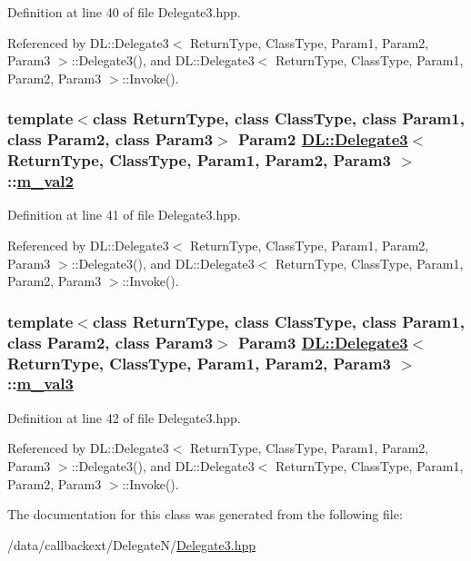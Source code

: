 Definition at line 40 of file Delegate3.hpp.

Referenced by DL::Delegate3$<$ Return\-Type, Class\-Type, Param1, Param2, Param3 $>$::Delegate3(), and DL::Delegate3$<$ Return\-Type, Class\-Type, Param1, Param2, Param3 $>$::Invoke().\hypertarget{classDL_1_1Delegate3_r3}{
\subsubsection[m\_\-val2]{\setlength{\rightskip}{0pt plus 5cm}template$<$class Return\-Type, class Class\-Type, class Param1, class Param2, class Param3$>$ Param2 \hyperlink{classDL_1_1Delegate3}{DL::Delegate3}$<$ Return\-Type, Class\-Type, Param1, Param2, Param3 $>$::\hyperlink{classDL_1_1Delegate3_r3}{m\_\-val2}}}
\label{classDL_1_1Delegate3_r3}




Definition at line 41 of file Delegate3.hpp.

Referenced by DL::Delegate3$<$ Return\-Type, Class\-Type, Param1, Param2, Param3 $>$::Delegate3(), and DL::Delegate3$<$ Return\-Type, Class\-Type, Param1, Param2, Param3 $>$::Invoke().\hypertarget{classDL_1_1Delegate3_r4}{
\subsubsection[m\_\-val3]{\setlength{\rightskip}{0pt plus 5cm}template$<$class Return\-Type, class Class\-Type, class Param1, class Param2, class Param3$>$ Param3 \hyperlink{classDL_1_1Delegate3}{DL::Delegate3}$<$ Return\-Type, Class\-Type, Param1, Param2, Param3 $>$::\hyperlink{classDL_1_1Delegate3_r4}{m\_\-val3}}}
\label{classDL_1_1Delegate3_r4}




Definition at line 42 of file Delegate3.hpp.

Referenced by DL::Delegate3$<$ Return\-Type, Class\-Type, Param1, Param2, Param3 $>$::Delegate3(), and DL::Delegate3$<$ Return\-Type, Class\-Type, Param1, Param2, Param3 $>$::Invoke().

The documentation for this class was generated from the following file:\begin{CompactItemize}
\item 
/data/callbackext/Delegate\-N/\hyperlink{Delegate3_8hpp}{Delegate3.hpp}\end{CompactItemize}
